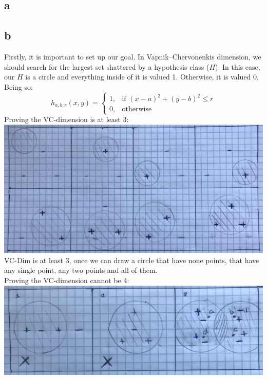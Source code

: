 \subsection{a}
\subsection{b}
Firstly, it is important to set up our goal. In Vapnik–Chervonenkis dimension, we should search for the largest set shattered by a hypothesis class ($H$). In this case, our $H$ is a circle and everything inside of it is valued 1. Otherwise, it is valued 0. Being so: \\
$$
h_{a,b,r}(x,y)=
        \begin{cases}
			1, & \text{if $(x-a)^2+(y-b)^2 \leq r$}\\
            0, & \text{otherwise}
		 \end{cases}
$$
\bigbreak
Proving the VC-dimension is at least 3:\\
\bigbreak
\includegraphics[width=\textwidth,height=\textheight,keepaspectratio]{3dim.jpg}\\
\bigbreak
VC-Dim is at least 3, once we can  draw a circle that have none points, that have any single point, any two points and all of them.\\
\bigbreak
Proving the VC-dimension cannot be 4:\\
\bigbreak
\includegraphics[width=\textwidth,height=\textheight,keepaspectratio]{4dim.jpg}
